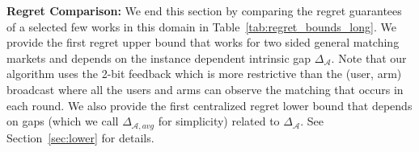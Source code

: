 \documentclass{article}
\begin{document}
\textbf{Regret Comparison:}
We end this section by comparing the regret guarantees of a selected few works in this domain in Table~\ref{tab:regret_bounds_long}. We provide the first regret upper bound that works for two sided general matching markets and depends on the instance dependent intrinsic gap $\Delta_{\mathcal{A}}$. Note that our algorithm uses the 2-bit feedback which is more restrictive than the (user, arm) broadcast where all the users and arms can observe the matching that occurs in each round. We also provide the first centralized regret lower bound that depends on gaps (which we call $\Delta_{\mathcal{A}, avg}$ for simplicity) related to $\Delta_{\mathcal{A}}$. See Section~\ref{sec:lower} for details. 
\end{document}
